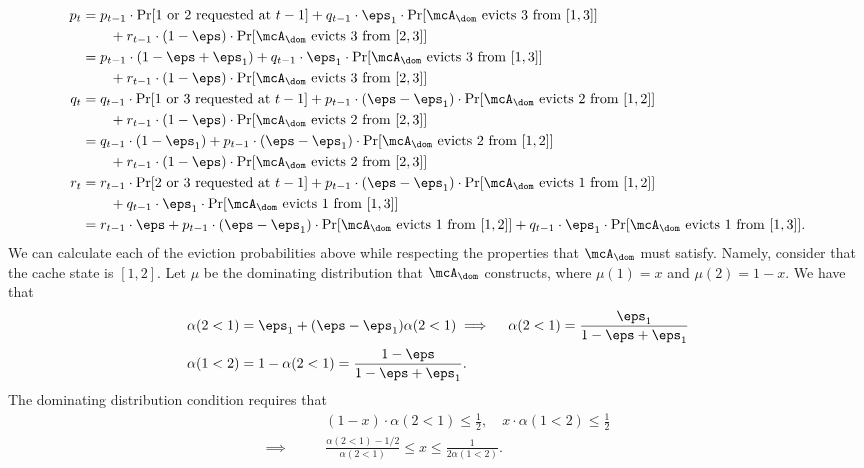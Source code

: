 \documentclass[11pt]{article}
\begin{document}
\begin{align*}
    p_t &= p_{t-1} \cdot \Pr[\text{1 or 2 requested at }t-1] + q_{t-1} \cdot \eps_1 \cdot \Pr[\text{$\mcA_\dom$ evicts 3 from }[1,3]] \\
    &\qquad+ r_{t-1} \cdot (1-\eps) \cdot \Pr[\text{$\mcA_\dom$ evicts 3 from }[2,3]] \\
    &= p_{t-1} \cdot (1-\eps+\eps_1) +  q_{t-1} \cdot \eps_1 \cdot \Pr[\text{$\mcA_\dom$ evicts 3 from }[1,3]] \\
    &\qquad+ r_{t-1} \cdot (1-\eps) \cdot \Pr[\text{$\mcA_\dom$ evicts 3 from }[2,3]] \\
    q_t &= q_{t-1} \cdot \Pr[\text{1 or 3 requested at }t-1] + p_{t-1} \cdot (\eps-\eps_1) \cdot \Pr[\text{$\mcA_\dom$ evicts 2 from }[1,2]] \\
    &\qquad+ r_{t-1} \cdot (1-\eps) \cdot \Pr[\text{$\mcA_\dom$ evicts 2 from }[2,3]] \\
    &= q_{t-1} \cdot (1-\eps_1) + p_{t-1} \cdot (\eps-\eps_1) \cdot \Pr[\text{$\mcA_\dom$ evicts 2 from }[1,2]] \\
    &\qquad+ r_{t-1} \cdot (1-\eps) \cdot \Pr[\text{$\mcA_\dom$ evicts 2 from }[2,3]] \\
    r_t &= r_{t-1} \cdot \Pr[\text{2 or 3 requested at }t-1] + p_{t-1} \cdot (\eps-\eps_1) \cdot \Pr[\text{$\mcA_\dom$ evicts 1 from }[1,2]] \\
    &\qquad+ q_{t-1} \cdot \eps_1 \cdot \Pr[\text{$\mcA_\dom$ evicts 1 from }[1,3]] \\
    &= r_{t-1} \cdot \eps + p_{t-1} \cdot (\eps-\eps_1) \cdot \Pr[\text{$\mcA_\dom$ evicts 1 from }[1,2]]  + q_{t-1} \cdot \eps_1 \cdot \Pr[\text{$\mcA_\dom$ evicts 1 from }[1,3]].
\end{align*}
We can calculate each of the eviction probabilities above while respecting the properties that $\mcA_\dom$ must satisfy. Namely, consider that the cache state is $[1,2]$. Let $\mu$ be the dominating distribution that $\mcA_\dom$ constructs, where $\mu(1)=x$ and $\mu(2)=1-x$. We have that
\begin{align*}
    \alpha(2<1) &= \eps_1 + (\eps-\eps_1)\alpha(2<1) \implies\quad \alpha(2<1) = \frac{\eps_1}{1-\eps+\eps_1} \\
    \alpha(1<2) &= 1-\alpha(2<1) = \frac{1-\eps}{1-\eps+\eps_1}.
\end{align*}
The dominating distribution condition requires that
\begin{align*}
    &(1-x)\cdot\alpha(2<1) \le \frac{1}{2}, \quad x\cdot\alpha(1<2) \le \frac{1}{2} \\ 
    \implies \qquad & \frac{\alpha(2<1)-1/2}{\alpha(2<1)} \le x \le \frac{1}{2\alpha(1<2)}.
\end{align*}
\end{document}
